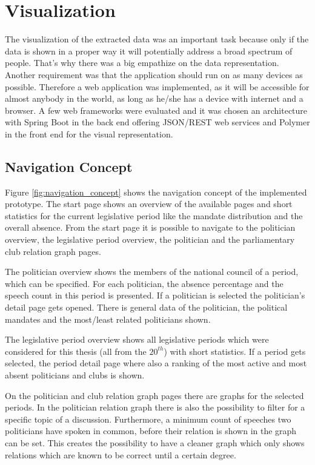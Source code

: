 \section{Visualization}
\label{sec:visualization}
The visualization of the extracted data was an important task because only if the data is shown in a proper way it will potentially address a broad spectrum of people. That's why there was a big empathize on the data representation. Another requirement was that the application should run on as many devices as possible. Therefore a web application was implemented, as it will be accessible for almost anybody in the world, as long as he/she has a device with internet and a browser. A few web frameworks were evaluated and it was chosen an architecture with Spring Boot in the back end offering JSON/REST web services and Polymer in the front end for the visual representation.


\subsection{Navigation Concept}
Figure \ref{fig:navigation_concept} shows the navigation concept of the implemented prototype. The start page shows an overview of the available pages and short statistics for the current legislative period like the mandate distribution and the overall absence. From the start page it is possible to navigate to the politician overview, the legislative period overview, the politician and the parliamentary club relation graph pages. 

The politician overview shows the members of the national council of a period, which can be specified. For each politician, the absence percentage and the speech count in this period is presented. If a politician is selected the politician's detail page gets opened. There is general data of the politician, the political mandates and the most/least related politicians shown.

The legislative period overview shows all legislative periods which were considered for this thesis (all from the $20^{th}$) with short statistics. If a period gets selected, the period detail page where also a ranking of the most active and most absent politicians and clubs is shown.

On the politician and club relation graph pages there are graphs for the selected periods. In the politician relation graph there is also the possibility to filter for a specific topic of a discussion. Furthermore, a minimum count of speeches two politicians have spoken in common, before their relation is shown in the graph can be set. This creates the possibility to have a cleaner graph which only shows relations which are known to be correct until a certain degree.

